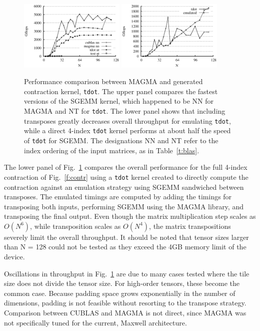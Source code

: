 \documentclass{sigplanconf}
\begin{document}
\begin{figure}
{ \centering
\includegraphics[width=0.45\textwidth]{sgemm.eps}
\includegraphics[width=0.45\textwidth]{gflops.eps} }
\caption{Performance comparison between MAGMA and generated contraction
kernel, {\tt tdot}.  The upper panel compares the fastest versions of the SGEMM kernel,
which happened to be NN for MAGMA and NT for {\tt tdot}.  The lower panel
shows that including transposes greatly decreases overall throughput for emulating {\tt tdot},
while a direct 4-index {\tt tdot} kernel performs at about half the speed of {\tt tdot} for SGEMM.
The designations NN and NT refer to the index ordering of the input matrices,
as in Table~\ref{t:blas}.}\label{f:gflops}
\end{figure}

  The lower panel of Fig.~\ref{f:gflops} compares the overall performance for the full
4-index contraction of Fig.~\ref{f:contr} using a {\tt tdot} kernel created
to directly compute the contraction against an emulation strategy using
SGEMM sandwiched between transposes.  The emulated timings are computed
by adding the timings for transposing both inputs, performing SGEMM using the MAGMA library,
and transposing the final output.  Even though the matrix multiplication
step scales as $O(N^6)$, while transposition scales as $O(N^4)$,
the matrix transpositions severely limit the overall throughput.  It should be noted
that tensor sizes larger than N = 128 could not be tested as they exceed the 4GB memory
limit of the device.

  Oscillations in throughput in Fig.~\ref{f:gflops}
are due to many cases tested where the tile size does
not divide the tensor size.
For high-order tensors, these become the common case.
Because padding space grows exponentially in the number
of dimensions, padding is not feasible without
resorting to the transpose strategy.
Comparison between CUBLAS and MAGMA is not direct,
since MAGMA was not specifically tuned for the current,
Maxwell architecture.
\end{document}
